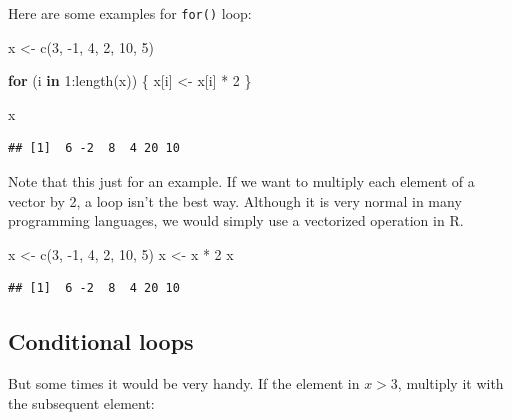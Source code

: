 \documentclass[
]{book}
\newenvironment{Shaded}{\begin{snugshade}}{\end{snugshade}}
\newcommand{\ControlFlowTok}[1]{\textcolor[rgb]{0.13,0.29,0.53}{\textbf{#1}}}
\newcommand{\DecValTok}[1]{\textcolor[rgb]{0.00,0.00,0.81}{#1}}
\newcommand{\FunctionTok}[1]{\textcolor[rgb]{0.00,0.00,0.00}{#1}}
\newcommand{\NormalTok}[1]{#1}
\newcommand{\OtherTok}[1]{\textcolor[rgb]{0.56,0.35,0.01}{#1}}
\newcommand{\SpecialCharTok}[1]{\textcolor[rgb]{0.00,0.00,0.00}{#1}}
\theoremstyle{definition}
\theoremstyle{definition}
\theoremstyle{definition}
\theoremstyle{definition}
\theoremstyle{remark}
\begin{document}
Here are some examples for \texttt{for()} loop:

\begin{Shaded}
\begin{Highlighting}[]
\NormalTok{x }\OtherTok{\textless{}{-}} \FunctionTok{c}\NormalTok{(}\DecValTok{3}\NormalTok{, }\SpecialCharTok{{-}}\DecValTok{1}\NormalTok{, }\DecValTok{4}\NormalTok{, }\DecValTok{2}\NormalTok{, }\DecValTok{10}\NormalTok{, }\DecValTok{5}\NormalTok{)}

\ControlFlowTok{for}\NormalTok{ (i }\ControlFlowTok{in} \DecValTok{1}\SpecialCharTok{:}\FunctionTok{length}\NormalTok{(x)) \{}
\NormalTok{  x[i] }\OtherTok{\textless{}{-}}\NormalTok{ x[i] }\SpecialCharTok{*} \DecValTok{2}
\NormalTok{\}}

\NormalTok{x}
\end{Highlighting}
\end{Shaded}

\begin{verbatim}
## [1]  6 -2  8  4 20 10
\end{verbatim}

Note that this just for an example. If we want to multiply each element of a vector by 2, a loop isn't the best way. Although it is very normal in many programming languages, we would simply use a vectorized operation in R.

\begin{Shaded}
\begin{Highlighting}[]
\NormalTok{x }\OtherTok{\textless{}{-}} \FunctionTok{c}\NormalTok{(}\DecValTok{3}\NormalTok{, }\SpecialCharTok{{-}}\DecValTok{1}\NormalTok{, }\DecValTok{4}\NormalTok{, }\DecValTok{2}\NormalTok{, }\DecValTok{10}\NormalTok{, }\DecValTok{5}\NormalTok{)}
\NormalTok{x }\OtherTok{\textless{}{-}}\NormalTok{ x }\SpecialCharTok{*} \DecValTok{2}
\NormalTok{x}
\end{Highlighting}
\end{Shaded}

\begin{verbatim}
## [1]  6 -2  8  4 20 10
\end{verbatim}

\hypertarget{conditional-loops}{%
\subsection{Conditional loops}\label{conditional-loops}}

But some times it would be very handy. If the element in \(x > 3\), multiply it with the subsequent element:
\end{document}
